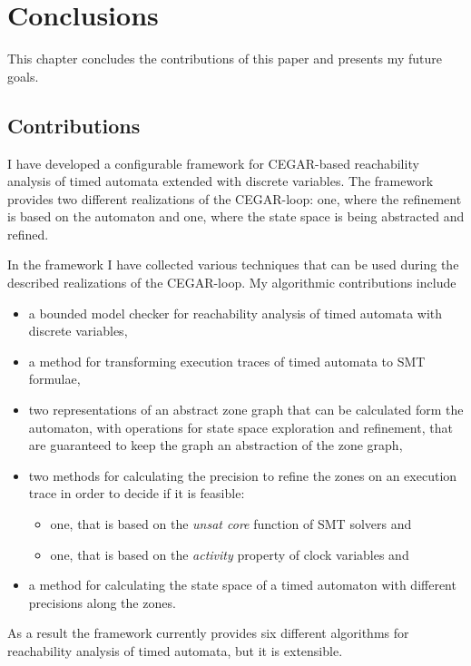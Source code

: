 \chapter{Conclusions}\label{chap:concl}

This chapter concludes the contributions of this paper and presents my future goals.

\section{Contributions}

I have developed a configurable framework for CEGAR-based reachability analysis of timed automata extended with discrete variables. The framework provides two different realizations of the CEGAR-loop: one, where the refinement is based on the automaton and one, where the state space is being abstracted and refined.

In the framework I have collected various techniques that can be used during the described realizations of the CEGAR-loop. My algorithmic contributions include
\begin{itemize}
	\item a bounded model checker for reachability analysis of timed automata with discrete variables,
	\item a method for transforming execution traces of timed automata to SMT formulae, %
	\item two representations of an abstract zone graph that can be calculated form the automaton, with operations for state space exploration and refinement, that are guaranteed to keep the graph an abstraction of the zone graph,
	\item two methods for calculating the precision to refine the zones on an execution trace in order to decide if it is feasible:
	\begin{itemize}
		\item one, that is based on the \emph{unsat core} function of SMT solvers and
		\item one, that is based on the \emph{activity} property of clock variables and
	\end{itemize}
	\item a method for calculating the state space of a timed automaton with different precisions along the zones.
\end{itemize}

As a result the framework currently provides six different algorithms for reachability analysis of timed automata, but it is extensible.


